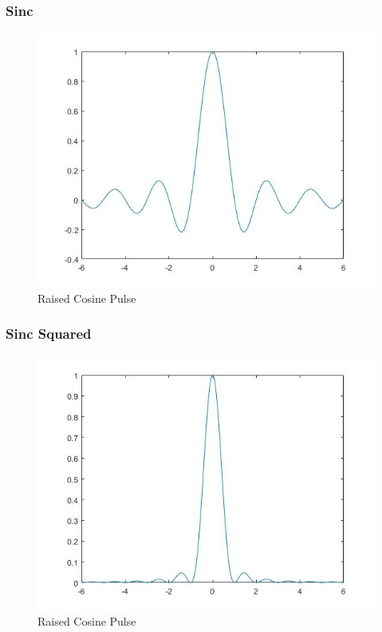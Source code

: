 \documentclass{article}
\begin{document}
\subsubsection{Sinc}
\begin{figure}[H]
  \begin{center}
    \includegraphics[width = \linewidth]{Sinc_Pulse.jpg}
    \caption{Raised Cosine Pulse}
    \label{fig:Sinc-Pulse}
  \end{center}
\end{figure}
\subsubsection{Sinc Squared}
\begin{figure}[H]
  \begin{center}
    \includegraphics[width = \linewidth]{Sinc_2_Pulse.jpg}
    \caption{Raised Cosine Pulse}
    \label{fig:Sinc-Squared}
  \end{center}
\end{figure}
\end{document}
